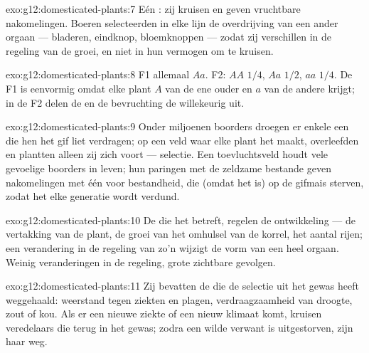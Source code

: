 \begin{solution}{exo:g12:domesticated-plants:7}
Eén : zij kruisen en geven vruchtbare nakomelingen. Boeren
selecteerden in elke lijn de overdrijving van een ander orgaan ---
bladeren, eindknop, bloemknoppen --- zodat zij verschillen in de regeling
van de groei, en niet in hun vermogen om te kruisen.
\end{solution}

\begin{solution}{exo:g12:domesticated-plants:8}
F1 allemaal $Aa$. F2: $AA$ $1/4$, $Aa$ $1/2$, $aa$ $1/4$. De F1 is
eenvormig omdat elke plant $A$ van de ene ouder en $a$ van de andere
krijgt; in de F2 delen de  en de bevruchting de  willekeurig
uit.
\end{solution}

\begin{solution}{exo:g12:domesticated-plants:9}
Onder miljoenen boorders droegen er enkele een  die hen het gif
liet verdragen; op een veld waar elke plant het maakt, overleefden en
plantten alleen zij zich voort --- selectie. Een toevluchtsveld houdt vele
gevoelige boorders in leven; hun paringen met de zeldzame bestande geven
nakomelingen met één  voor bestandheid, die (omdat het  is)
op de gifmais sterven, zodat het  elke generatie wordt verdund.
\end{solution}

\begin{solution}{exo:g12:domesticated-plants:10}
De  die het betreft, regelen de ontwikkeling --- de vertakking van de
plant, de groei van het omhulsel van de korrel, het aantal rijen; een
verandering in de regeling van zo'n  wijzigt de vorm van een heel
orgaan. Weinig veranderingen in de regeling, grote zichtbare gevolgen.
\end{solution}

\begin{solution}{exo:g12:domesticated-plants:11}
Zij bevatten de  die de selectie uit het gewas heeft weggehaald:
weerstand tegen ziekten en plagen, verdraagzaamheid van droogte, zout of
kou. Als er een nieuwe ziekte of een nieuw klimaat komt, kruisen
veredelaars die  terug in het gewas; zodra een wilde verwant is
uitgestorven, zijn haar  weg.
\end{solution}

